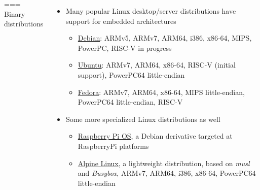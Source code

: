 \begin{columns}
=== {Binary distributions}
  \begin{itemize}
  \item Many popular Linux desktop/server distributions have support
    for embedded architectures
    \begin{itemize}
    \item \href{https://www.debian.org}{Debian}: ARMv5, ARMv7, ARM64,
      i386, x86-64, MIPS, PowerPC, RISC-V in progress
    \item \href{https://www.ubuntu.com}{Ubuntu}: ARMv7, ARM64,
      x86-64, RISC-V (initial support), PowerPC64 little-endian
    \item \href{https://getfedora.org}{Fedora}: ARMv7, ARM64, x86-64,
      MIPS little-endian, PowerPC64 little-endian, RISC-V
    \end{itemize}
  \item Some more specialized Linux distributions as well
    \begin{itemize}
    \item \href{https://www.raspberrypi.com/software/}{Raspberry Pi
        OS}, a Debian derivative targeted at RaspberryPi platforms
    \item \href{https://www.alpinelinux.org/}{Alpine Linux}, a
      lightweight distribution, based on {\em musl} and {\em Busybox},
      ARMv7, ARM64, i386, x86-64, PowerPC64 little-endian
    \end{itemize}
  \end{itemize}



\end{columns}
